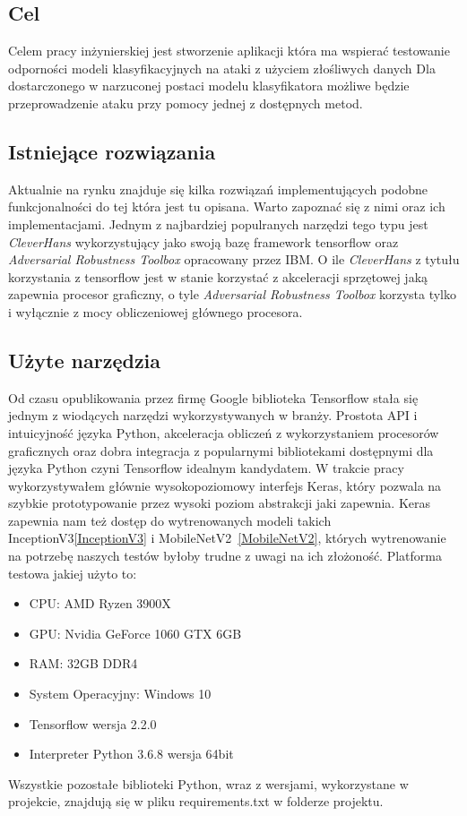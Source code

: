 \documentclass[
    left=2.5cm,         %
    right=2.5cm,        %
    top=2.5cm,          %
    bottom=3cm,         %
    bindingoffset=6mm,  %
    nohyphenation=false %
]{eiti/eiti-thesis}
\begin{document}
\subsection{Cel}
\label{sec:target}

Celem pracy inżynierskiej jest stworzenie aplikacji która ma wspierać testowanie
odporności modeli klasyfikacyjnych na ataki z użyciem złośliwych danych
Dla dostarczonego w narzuconej postaci modelu klasyfikatora możliwe będzie
przeprowadzenie ataku przy pomocy jednej z dostępnych metod.

\subsection{Istniejące rozwiązania}

Aktualnie na rynku znajduje się kilka rozwiązań implementujących podobne funkcjonalności
do tej która jest tu opisana. Warto zapoznać się z nimi oraz ich implementacjami.
Jednym z najbardziej populranych narzędzi tego typu jest \textit{CleverHans}\cite{DBLP:journals/corr/GoodfellowPM16}
wykorzystujący jako swoją bazę framework tensorflow oraz \textit{Adversarial Robustness Toolbox}\cite{DBLP:journals/corr/abs-1807-01069} opracowany przez IBM.
O ile \textit{CleverHans} z tytułu korzystania z tensorflow jest w stanie korzystać z akceleracji sprzętowej jaką zapewnia procesor graficzny, o tyle
\textit{Adversarial Robustness Toolbox} korzysta tylko i wyłącznie z mocy obliczeniowej głównego procesora.

\subsection{Użyte narzędzia}
Od czasu opublikowania przez firmę Google biblioteka Tensorflow \cite{DBLP:journals/corr/AbadiABBCCCDDDG16}
stała się jednym z wiodących narzędzi wykorzystywanych w branży. Prostota API i intuicyjność
języka Python, akceleracja obliczeń z wykorzystaniem procesorów graficznych oraz dobra integracja z
popularnymi bibliotekami dostępnymi dla języka Python czyni Tensorflow idealnym kandydatem.
W trakcie pracy wykorzystywałem głównie wysokopoziomowy interfejs Keras, który pozwala na szybkie
prototypowanie przez wysoki poziom abstrakcji jaki zapewnia. Keras zapewnia nam też dostęp do wytrenowanych modeli takich
InceptionV3\ref{InceptionV3} i MobileNetV2~\ref{MobileNetV2}, których wytrenowanie na potrzebę naszych testów byłoby
trudne z uwagi na ich złożoność.
Platforma testowa jakiej użyto to:
\begin{itemize}
    \item CPU: AMD Ryzen 3900X
    \item GPU: Nvidia GeForce 1060 GTX 6GB
    \item RAM: 32GB DDR4
    \item System Operacyjny: Windows 10
    \item Tensorflow wersja 2.2.0
    \item Interpreter Python 3.6.8 wersja 64bit
\end{itemize}
Wszystkie pozostałe biblioteki Python, wraz z wersjami, wykorzystane w projekcie, znajdują się w pliku
requirements.txt w folderze projektu.
\end{document}
